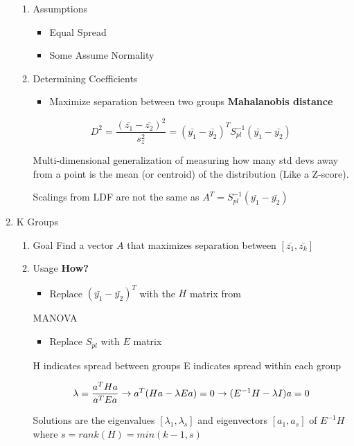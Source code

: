 \documentclass[11pt]{article}
\begin{document}
\begin{enumerate}
\begin{enumerate}
\item Assumptions
\label{sec:org4b5bc76}
\begin{itemize}
\item Equal Spread
\item Some Assume Normality
\end{itemize}

\item Determining Coefficients
\label{sec:org4e0300e}
\begin{itemize}
\item Maximize separation between two groups \textbf{Mahalanobis distance}
\end{itemize}

$$
D^2 = \frac{(\bar{z_1} - \bar{z_2})^2} {s^2_z} = (\bar{y_1} - \bar{y_2})^TS_{pl}^{-1}(\bar{y_1} - \bar{y_2}) 
$$

Multi-dimensional generalization of measuring how many std devs away
from a point is the mean (or centroid) of the distribution (Like a
Z-score).

Scalings from LDF are not the same as
\(A^T = S_{pl}^{-1}(\bar{y_1} - \bar{y_2})\)
\end{enumerate}

\item K Groups
\label{sec:org7545a45}
\begin{enumerate}
\item Goal
\label{sec:org37cacda}
Find a vector \(A\) that maximizes separation between
\([\bar{z_1},\bar{z_k}]\)

\item Usage
\label{sec:orgf693a13}
\textbf{How?}
\begin{itemize}
\item Replace \((\bar{y_1} - \bar{y_2})^T\) with the \(H\) matrix from
\end{itemize}
MANOVA
\begin{itemize}
\item Replace \(S_{pl}\) with \(E\) matrix
\end{itemize}

H indicates spread between groups E indicates spread within each group

$$
    \lambda = \frac{a^T H a}{a^T E a} \newline 
    \to a^T(Ha - \lambda Ea) = 0 \newline 
    \to (E^{-1}H - \lambda I)a = 0
$$

Solutions are the eigenvalues \([\lambda_1,\lambda_s]\) and eigenvectors
\([a_1, a_s]\) of \(E^{-1}H\) where \(s = rank(H) = min(k-1, s)\)


\end{enumerate}
\end{enumerate}
\end{document}
